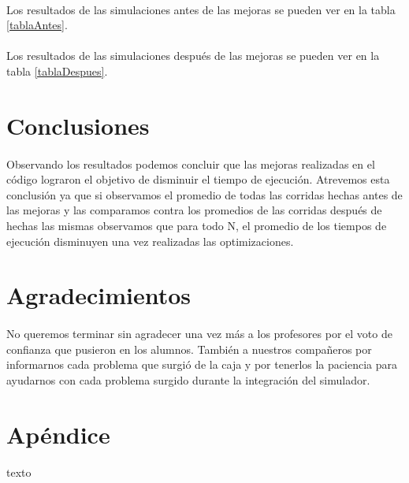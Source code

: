 \documentclass{article}
\begin{document}
\paragraph{}
Los resultados de las simulaciones antes de las mejoras se pueden ver en la tabla \ref{tablaAntes}.

\paragraph{}
Los resultados de las simulaciones después de las mejoras se pueden ver en la tabla \ref{tablaDespues}.

\section{Conclusiones}

\paragraph{}
Observando los resultados podemos concluir que las mejoras realizadas en el código lograron el objetivo de disminuir el tiempo de ejecución. Atrevemos esta conclusión ya que si observamos el promedio de todas las corridas hechas antes de las mejoras y las comparamos contra los promedios de las corridas después de hechas las mismas observamos que para todo N, el promedio de los tiempos de ejecución disminuyen una vez realizadas las optimizaciones.

\section{Agradecimientos}

\paragraph{}
No queremos terminar sin agradecer una vez más a los profesores por el voto de confianza que pusieron en los alumnos. También a nuestros compañeros por informarnos cada problema que surgió de la caja y por tenerlos la paciencia para ayudarnos con cada problema surgido durante la integración del simulador.

\section{Apéndice}

\paragraph{}
texto
\end{document}
